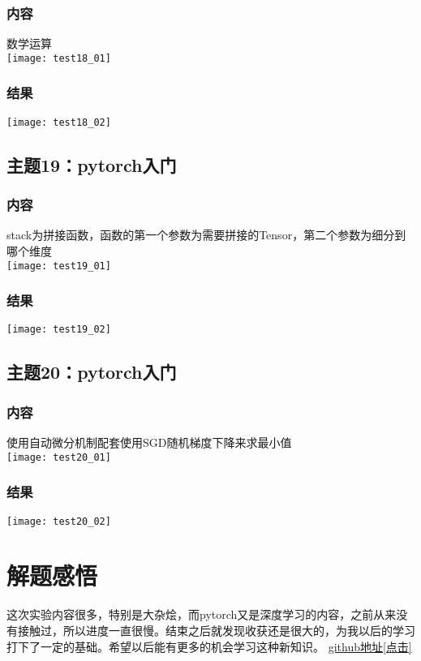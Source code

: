 \documentclass{article}
\begin{document}
\subsubsection{内容}
数学运算\\
\texttt{[image: test18\_01]}\\
\subsubsection{结果}  
\texttt{[image: test18\_02]}\\
\vspace{1cm}
\subsection{主题19：pytorch入门}  
\subsubsection{内容}
stack为拼接函数，函数的第一个参数为需要拼接的Tensor，第二个参数为细分到哪个维度\\
\texttt{[image: test19\_01]}\\
\subsubsection{结果}  
\texttt{[image: test19\_02]}\\
\vspace{1cm}
\subsection{主题20：pytorch入门}  
\subsubsection{内容}
使用自动微分机制配套使用SGD随机梯度下降来求最小值\\
\texttt{[image: test20\_01]}\\
\subsubsection{结果}  
\texttt{[image: test20\_02]}\\
\newpage
\thispagestyle{empty}
\section{解题感悟}  
这次实验内容很多，特别是大杂烩，而pytorch又是深度学习的内容，之前从来没有接触过，所以进度一直很慢。结束之后就发现收获还是很大的，为我以后的学习打下了一定的基础。希望以后能有更多的机会学习这种新知识。
\href{https://github.com/coff-sug/system_development.git}{github地址[点击]}
\end{document}

